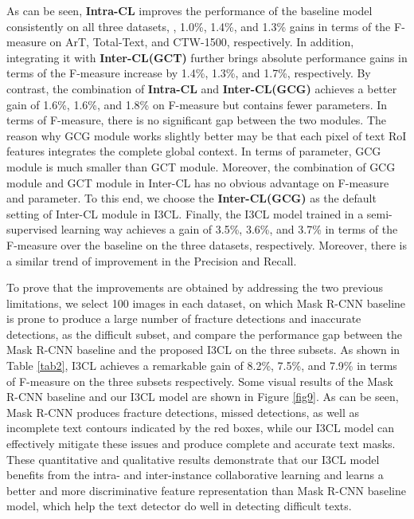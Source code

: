 As can be seen, \textbf{Intra-CL} improves the performance of the baseline model consistently on all three datasets, , 1.0\%, 1.4\%, and 1.3\% gains in terms of the F-measure on ArT, Total-Text, and CTW-1500, respectively. In addition, integrating it with \textbf{Inter-CL(GCT)} further brings absolute performance gains in terms of the F-measure increase by 1.4\%, 1.3\%, and 1.7\%, respectively. By contrast, the combination of \textbf{Intra-CL} and \textbf{Inter-CL(GCG)} achieves a better gain of 1.6\%, 1.6\%, and 1.8\% on F-measure but contains fewer parameters. In terms of F-measure, there is no significant gap between the two modules. The reason why GCG module works slightly better may be that each pixel of text RoI features integrates the complete global context. In terms of parameter, GCG module is much smaller than GCT module. Moreover, the combination of GCG module and GCT module in Inter-CL has no obvious advantage on F-measure and parameter. To this end, we choose the \textbf{Inter-CL(GCG)} as the default setting of Inter-CL module in I3CL. Finally, the I3CL model trained in a semi-supervised learning way achieves a gain of 3.5\%, 3.6\%, and 3.7\% in terms of the F-measure over the baseline on the three datasets, respectively. Moreover, there is a similar trend of improvement in the Precision and Recall. 

To prove that the improvements are obtained by addressing the two previous limitations, we select 100 images in each dataset, on which Mask R-CNN baseline is prone to produce a large number of fracture detections and inaccurate detections, as the difficult subset, and compare the performance gap between the Mask R-CNN baseline and the proposed I3CL on the three subsets. As shown in Table \ref{tab2}, I3CL achieves a remarkable gain of 8.2\%, 7.5\%, and 7.9\% in terms of F-measure on the three subsets respectively. Some visual results of the Mask R-CNN baseline and our I3CL model are shown in Figure \ref{fig9}. As can be seen, Mask R-CNN produces fracture detections, missed detections, as well as incomplete text contours indicated by the red boxes, while our I3CL model can effectively mitigate these issues and produce complete and accurate text masks. These quantitative and qualitative results demonstrate that our I3CL model benefits from the intra- and inter-instance collaborative learning and learns a better and more discriminative feature representation than Mask R-CNN baseline model, which help the text detector do well in detecting difficult texts.

